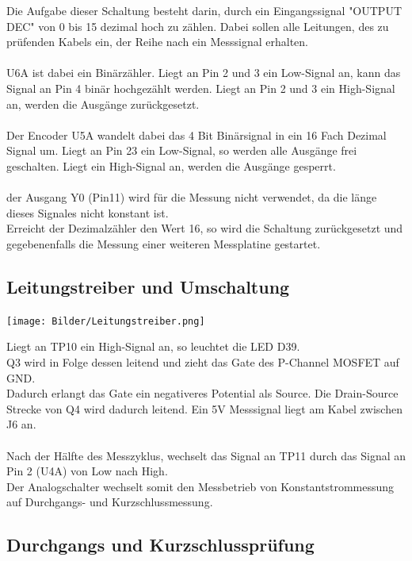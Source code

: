 \documentclass[a4paper,11pt]{scrartcl}
\begin{document}
Die Aufgabe dieser Schaltung besteht darin, durch ein Eingangssignal "OUTPUT DEC" von 0 bis 15 dezimal hoch zu zählen. Dabei sollen alle Leitungen, des zu prüfenden Kabels ein, der Reihe nach ein Messsignal erhalten.
\\
\\
U6A ist dabei ein Binärzähler. Liegt an Pin 2 und 3 ein Low-Signal an, kann das Signal an Pin 4 binär hochgezählt werden. Liegt an Pin 2 und 3 ein High-Signal an, werden die Ausgänge zurückgesetzt.
\\
\\
Der Encoder U5A wandelt dabei das 4 Bit Binärsignal in ein 16 Fach Dezimal Signal um. Liegt an Pin 23 ein Low-Signal, so werden alle Ausgänge frei geschalten. Liegt ein High-Signal an, werden die Ausgänge gesperrt.
\\
\\
der Ausgang Y0 (Pin11) wird für die Messung nicht verwendet, da die länge dieses Signales nicht konstant ist.
\\
Erreicht der Dezimalzähler den Wert 16, so wird die Schaltung zurückgesetzt und gegebenenfalls die Messung einer weiteren Messplatine gestartet.


\newpage
\subsection{Leitungstreiber und Umschaltung}

\begin{center}
\texttt{[image: Bilder/Leitungstreiber.png]}
\end{center}

Liegt an TP10 ein High-Signal an, so leuchtet die LED D39.
\\
Q3 wird in Folge dessen leitend und zieht das Gate des P-Channel MOSFET auf GND. 
\\
Dadurch erlangt das Gate ein negativeres Potential als Source. Die Drain-Source Strecke von Q4 wird dadurch leitend. Ein 5V Messsignal liegt am Kabel zwischen J6 an. 
\\
\\
Nach der Hälfte des Messzyklus, wechselt das Signal an TP11 durch das Signal an Pin 2 (U4A) von Low nach High. 
\\
Der Analogschalter wechselt somit den Messbetrieb von Konstantstrommessung auf Durchgangs- und Kurzschlussmessung.

\newpage
\subsection{Durchgangs und Kurzschlussprüfung}
\end{document}
